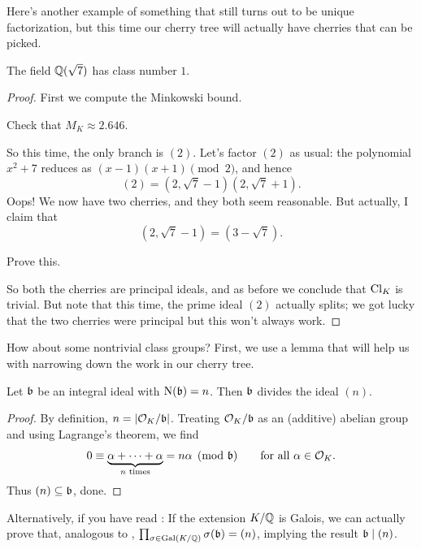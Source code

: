 Here's another example of something that still turns out to be unique factorization,
but this time our cherry tree will actually have cherries that can be picked.
\begin{proposition}[{$\ZZ[\sqrt7]$} is a UFD]
	The field $\mathbb Q(\sqrt7)$ has class number $1$.
\end{proposition}
\begin{proof}
	First we compute the Minkowski bound.
	\begin{ques}
		Check that $M_K \approx 2.646$.
	\end{ques}
	So this time, the only branch is $(2)$. Let's factor $(2)$ as usual: the polynomial $x^2+7$
	reduces as $(x-1)(x+1) \pmod 2$, and hence
	\[ (2) = \left( 2, \sqrt7-1 \right) \left( 2, \sqrt7+1 \right). \]
	Oops! We now have two cherries, and they both seem reasonable.
	But actually, I claim that
	\[ \left( 2, \sqrt7-1 \right) = \left( 3 - \sqrt 7 \right). \]
	\begin{ques}
		Prove this.
	\end{ques}
	So both the cherries are principal ideals, and as before we conclude that $\mathrm{Cl}_K$ is trivial.
	But note that this time, the prime ideal $(2)$ actually splits; we got lucky
	that the two cherries were principal but this won't always work.
\end{proof}

How about some nontrivial class groups?
First, we use a lemma that will help us with
narrowing down the work in our cherry tree.
\begin{lemma}
	\label{lemma:ideal_divides_norm}
	Let $\mathfrak b$ be an integral ideal with $\operatorname{N}(\mathfrak b) = n$.
	Then $\mathfrak b$ divides the ideal $(n)$.
\end{lemma}
\begin{proof}
	By definition, $n = \left\lvert \mathcal O_K / \mathfrak b \right\rvert$.
	Treating $\mathcal O_K/\mathfrak b$ as an (additive) abelian group and using Lagrange's theorem, we find
	\[ 0 \equiv
		\underbrace{\alpha + \dots + \alpha}_{n\text{ times}} = n\alpha
		\pmod {\mathfrak b} \qquad\text{for all } \alpha \in \mathcal O_K. \]
	Thus $(n) \subseteq \mathfrak b$, done.
\end{proof}

Alternatively, if you have read :
If the extension $K/\mathbb Q$ is Galois, we can actually prove that, analogous to
,
$\prod_{\sigma \in \operatorname{Gal}(K/\mathbb Q)} \sigma(\mathfrak b) = (n)$, implying the result $\mathfrak b \mid (n)$.

